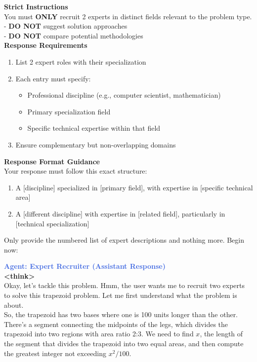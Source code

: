 \begin{tcolorbox}[
  title=Multiagent Collaborative Reasoning Trace Data Sample,
  breakable,
  colback=white,
  colframe=black
]
\textbf{Strict Instructions} \\[1ex]
You must \textbf{ONLY} recruit 2 experts in distinct fields relevant to the problem type. \\
- \textbf{DO NOT} suggest solution approaches \\
- \textbf{DO NOT} compare potential methodologies \\[2ex]

\textbf{Response Requirements} \\[1ex]
\begin{enumerate}
  \item List 2 expert roles with their specialization
  \item Each entry must specify:
  \begin{itemize}
    \item Professional discipline (e.g., computer scientist, mathematician)
    \item Primary specialization field
    \item Specific technical expertise within that field
  \end{itemize}
  \item Ensure complementary but non-overlapping domains
\end{enumerate}

\textbf{Response Format Guidance} \\[1ex]
Your response must follow this exact structure:
\begin{enumerate}
  \item A [discipline] specialized in [primary field], with expertise in [specific technical area]
  \item A [different discipline] with expertise in [related field], particularly in [technical specialization]
\end{enumerate}

Only provide the numbered list of expert descriptions and nothing more. Begin now:

\textcolor{royalblue}{\textbf{Agent: Expert Recruiter (Assistant Response)}} \\
\textbf{\textless think\textgreater} \\

Okay, let's tackle this problem. Hmm, the user wants me to recruit two experts to solve this trapezoid problem. Let me first understand what the problem is about.\\[1ex]

So, the trapezoid has two bases where one is 100 units longer than the other. There's a segment connecting the midpoints of the legs, which divides the trapezoid into two regions with area ratio 2:3. We need to find \(x\), the length of the segment that divides the trapezoid into two equal areas, and then compute the greatest integer not exceeding \(x^2/100\).\\[1ex]


\end{tcolorbox}
